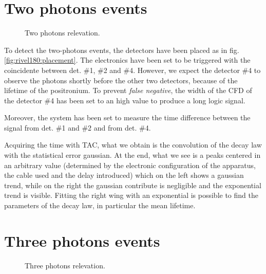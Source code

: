 \documentclass[11pt,a4 paper]{article}
\begin{document}

\section{Two photons events}

\begin{figure}[H]
    \centering
     \quad
    \caption{Two photons relevation.}
    \label{fig:rivel180}
\end{figure}

To detect the two-photons events, the detectors have been placed as in fig. \ref{fig:rivel180:placement}. The electronics have been set to be triggered with the coincidente between det. \#1, \#2 and \#4. However, we expect the detector \#4 to observe the photons shortly before the other two detectors, because of the lifetime of the positronium. To prevent \emph{false negative}, the width of the CFD of the detector \#4 has been set to an high value to produce a long logic signal.

Moreover, the system has been set to measure the time difference between the signal from det. \#1 and \#2 and from det. \#4. 


Acquiring the time with TAC, what we obtain is the convolution of the decay law with the statistical error gaussian. At the end, what we see is a peaks centered in an arbitrary value (determined by the electronic configuration of the apparatus, the cable used and the delay introduced) which on the left shows a gaussian trend, while on the right the gaussian contribute is negligible and the exponential trend is visible. Fitting the right wing with an exponential is possible to find the parameters of the decay law, in particular the mean lifetime.

\section{Three photons events}

\begin{figure}[H]
    \centering
     \quad
    \caption{Three photons relevation.}
    \label{fig:rivel120}
\end{figure}
\end{document}
